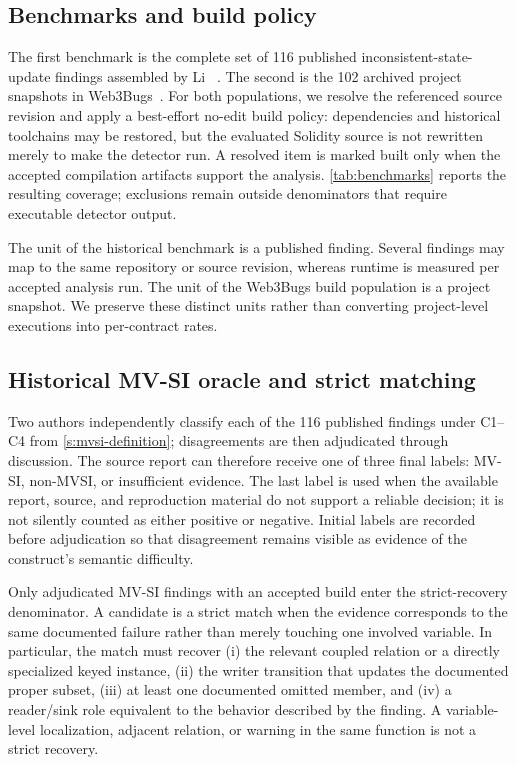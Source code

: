 \subsection{Benchmarks and build policy}
\label{s:evaluation-benchmarks}

The first benchmark is the complete set of 116 published inconsistent-state-update findings assembled by Li \etal~\cite{li2026understanding}. The second is the 102 archived project snapshots in Web3Bugs~\cite{zhang2023demystifying}. For both populations, we resolve the referenced source revision and apply a best-effort no-edit build policy: dependencies and historical toolchains may be restored, but the evaluated Solidity source is not rewritten merely to make the detector run. A resolved item is marked built only when the accepted compilation artifacts support the analysis. \autoref{tab:benchmarks} reports the resulting coverage; exclusions remain outside denominators that require executable detector output.



The unit of the historical benchmark is a published finding. Several findings may map to the same repository or source revision, whereas runtime is measured per accepted analysis run. The unit of the Web3Bugs build population is a project snapshot. We preserve these distinct units rather than converting project-level executions into per-contract rates.

\subsection{Historical MV-SI oracle and strict matching}
\label{s:historical-oracle}

Two authors independently classify each of the 116 published findings under C1--C4 from \autoref{s:mvsi-definition}; disagreements are then adjudicated through discussion. The source report can therefore receive one of three final labels: MV-SI, non-MVSI, or insufficient evidence. The last label is used when the available report, source, and reproduction material do not support a reliable decision; it is not silently counted as either positive or negative. Initial labels are recorded before adjudication so that disagreement remains visible as evidence of the construct's semantic difficulty.

Only adjudicated MV-SI findings with an accepted build enter the strict-recovery denominator. A \sys candidate is a strict match when the evidence corresponds to the same documented failure rather than merely touching one involved variable. In particular, the match must recover (i) the relevant coupled relation or a directly specialized keyed instance, (ii) the writer transition that updates the documented proper subset, (iii) at least one documented omitted member, and (iv) a reader/sink role equivalent to the behavior described by the finding. A variable-level localization, adjacent relation, or warning in the same function is not a strict recovery.

